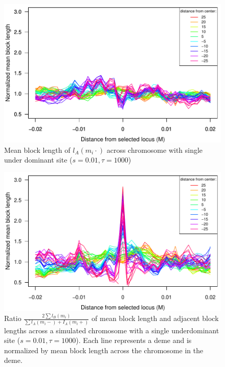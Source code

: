 \begin{figure}
\includegraphics{figs/adjacentBlocksAlongChromAncBConditioning}
\caption{Mean block length of $l_A(m_i\cdot)$ across chromosome with single under dominant site ($s=0.01, \tau=1000$)}\label{Supp:adjacentBlocks}
\end{figure}


\begin{figure}
\includegraphics{figs/ratioAdjacentBlocksAlongChromAncBConditioning}
\caption{Ratio $\frac{2\sum{l_B(m_i)}}{\sum{l_A(m_i-)+I_A(m_i+)}}$ of mean block length and adjacent block lengths across a simulated chromosome with a single underdominant site ($s=0.01, \tau=1000$).  Each line represents a deme and is normalized by mean block length across the chromosome in the deme.}\label{Supp:ratioBlockAdjacent}
\end{figure}


